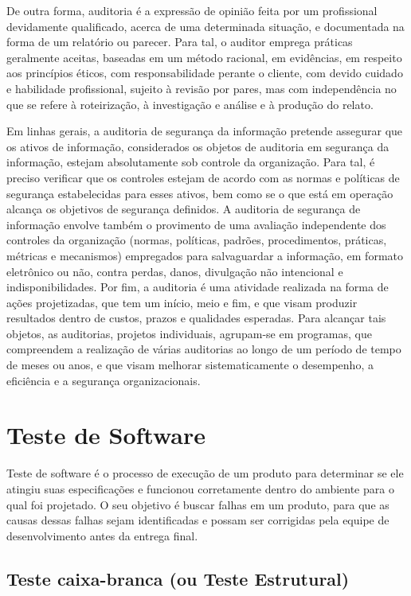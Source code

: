 De outra forma, auditoria é a expressão de opinião feita por um profissional devidamente
qualificado, acerca de uma determinada situação, e documentada na forma de um relatório
ou parecer. Para tal, o auditor emprega práticas geralmente aceitas, baseadas em um método
racional, em evidências, em respeito aos princípios éticos, com responsabilidade perante o
cliente, com devido cuidado e habilidade profissional, sujeito à revisão por pares, mas com
independência no que se refere à roteirização, à investigação e análise e à produção do relato.

Em linhas gerais, a auditoria de segurança da informação pretende assegurar que os ativos de informação, considerados os objetos de auditoria em segurança da informação, estejam absolutamente sob controle da organização. Para tal, é preciso verificar que os controles
estejam de acordo com as normas e políticas de segurança estabelecidas para esses ativos,
bem como se o que está em operação alcança os objetivos de segurança definidos. A auditoria
de segurança de informação envolve também o provimento de uma avaliação independente
dos controles da organização (normas, políticas, padrões, procedimentos, práticas, métricas
e mecanismos) empregados para salvaguardar a informação, em formato eletrônico ou não,
contra perdas, danos, divulgação não intencional e indisponibilidades. Por fim, a auditoria é
uma atividade realizada na forma de ações projetizadas, que tem um início, meio e fim, e que
visam produzir resultados dentro de custos, prazos e qualidades esperadas. Para alcançar tais
objetos, as auditorias, projetos individuais, agrupam-se em programas, que compreendem a
realização de várias auditorias ao longo de um período de tempo de meses ou anos, e que
visam melhorar sistematicamente o desempenho, a eficiência e a segurança organizacionais.

\nocite{auditoria}

\section{Teste de Software}

Teste de software é o processo de execução de um produto para determinar se ele atingiu suas especificações e funcionou corretamente dentro do ambiente para o qual foi projetado.
O seu objetivo é buscar falhas em um produto, para que as causas dessas falhas sejam identificadas e possam ser corrigidas pela equipe de desenvolvimento antes da entrega final.

\subsection{Teste caixa-branca (ou Teste Estrutural)}

